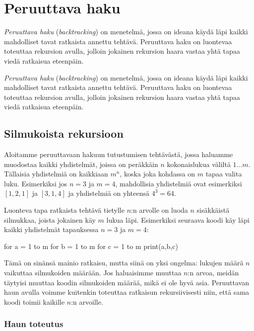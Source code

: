 \chapter{Peruuttava haku}

\emph{Peruuttava haku} (\emph{backtracking}) on menetelmä,
jossa on ideana käydä läpi kaikki mahdolliset tavat 
ratkaista annettu tehtävä.
Peruuttava haku on luontevaa toteuttaa rekursion avulla,
jolloin jokainen rekursion haara vastaa yhtä tapaa
viedä ratkaisua eteenpäin.

\emph{Peruuttava haku} (\emph{backtracking}) on menetelmä,
jossa on ideana käydä läpi kaikki mahdolliset tavat 
ratkaista annettu tehtävä.
Peruuttava haku on luontevaa toteuttaa rekursion avulla,
jolloin jokainen rekursion haara vastaa yhtä tapaa
viedä ratkaisua eteenpäin.

\section{Silmukoista rekursioon}

Aloitamme peruuttavaan hakuun tutustumisen tehtävästä,
jossa haluamme muodostaa kaikki yhdistelmät,
joissa on peräkkäin $n$ kokonaislukua väliltä $1 \dots m$.
Tällaisia yhdistelmiä on kaikkiaan $m^n$,
koska joka kohdassa on $m$ tapaa valita luku.
Esimerkiksi jos $n=3$ ja $m=4$, mahdollisia yhdistelmiä
ovat esimerkiksi $[1,2,1]$ ja $[3,1,4]$
ja yhdistelmiä on yhteensä $4^3=64$.

Luonteva tapa ratkaista tehtävä tietylle $n$:n arvolle on
luoda $n$ sisäkkäistä silmukkaa, joista jokainen käy $m$ lukua läpi.
Esimerkiksi seuraava koodi käy läpi kaikki yhdistelmät
tapauksessa $n=3$ ja $m=4$:

\begin{code}
for a = 1 to m
    for b = 1 to m
        for c = 1 to m
            print(a,b,c)
\end{code}

Tämä on sinänsä mainio ratkaisu, mutta siinä on yksi ongelma:
lukujen määrä $n$ vaikuttaa silmukoiden määrään.
Jos haluaisimme muuttaa $n$:n arvoa, meidän täytyisi muuttaa
koodin silmukoiden määrää, mikä ei ole hyvä asia.
Peruuttavan haun avulla voimme kuitenkin toteuttaa ratkaisun
rekursiivisesti niin, että sama koodi toimii kaikille $n$:n arvoille.

\subsection{Haun toteutus}

